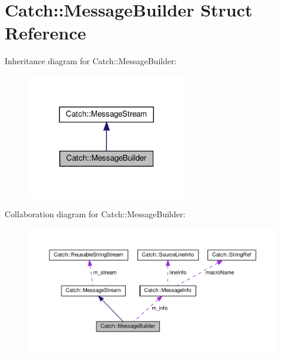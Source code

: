 \hypertarget{structCatch_1_1MessageBuilder}{}\section{Catch\+::Message\+Builder Struct Reference}
\label{structCatch_1_1MessageBuilder}


Inheritance diagram for Catch\+::Message\+Builder\+:\nopagebreak
\begin{figure}[H]
\begin{center}
\leavevmode
\includegraphics[width=200pt]{structCatch_1_1MessageBuilder__inherit__graph}
\end{center}
\end{figure}


Collaboration diagram for Catch\+::Message\+Builder\+:\nopagebreak
\begin{figure}[H]
\begin{center}
\leavevmode
\includegraphics[width=350pt]{structCatch_1_1MessageBuilder__coll__graph}
\end{center}
\end{figure}

